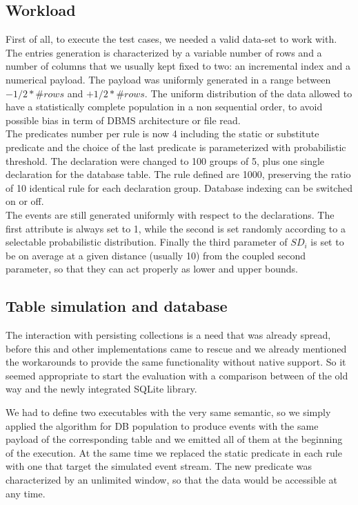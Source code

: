 \subsection{Workload}
First of all, to execute the test cases, we needed a valid data-set to work with. The entries generation is characterized by a variable number of rows and a number of columns that we usually kept fixed to two: an incremental index and a numerical payload. The payload was uniformly generated in a range between $-1 / 2 * \#rows$ and $+1 / 2 * \#rows$. The uniform distribution of the data allowed to have a statistically complete population in a non sequential order, to avoid possible bias in term of DBMS architecture or file read.\\
The predicates number per rule is now 4 including the static or substitute predicate and the choice of the last predicate is parameterized with probabilistic threshold. The declaration were changed to 100 groups of 5, plus one single declaration for the database table. The rule defined are 1000, preserving the ratio of 10 identical rule for each declaration group. Database indexing can be switched on or off.\\
The events are still generated uniformly with respect to the declarations. The first attribute is always set to 1, while the second is set randomly according to a selectable probabilistic distribution. Finally the third parameter of $SD_i$ is set to be on average at a given distance (usually 10) from the coupled second parameter, so that they can act properly as lower and upper bounds.

\subsection{Table simulation and database}
The interaction with persisting collections is a need that was already spread, before this and other implementations came to rescue and we already mentioned the workarounds to provide the same functionality without native support. So it seemed appropriate to start the evaluation with a comparison between of the old way and the newly integrated SQLite library.

We had to define two executables with the very same semantic, so we simply applied the algorithm for DB population to produce events with the same payload of the corresponding table and we emitted all of them at the beginning of the execution. At the same time we replaced the static predicate in each rule with one that target the simulated event stream. The new predicate was characterized by an unlimited window, so that the data would be accessible at any time.

